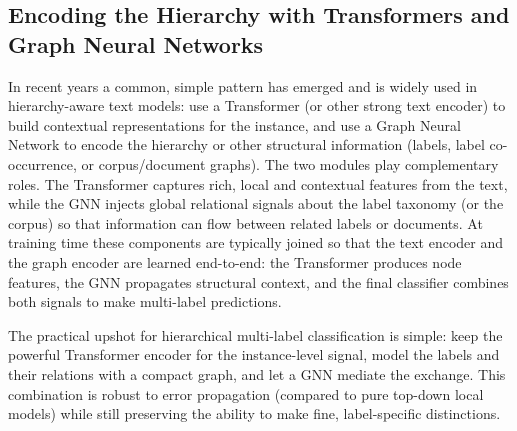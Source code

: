 \subsection{Encoding the Hierarchy with Transformers and Graph Neural Networks}

In recent years a common, simple pattern has emerged and is widely used in
hierarchy-aware text models: use a Transformer (or other strong text encoder)
to build contextual representations for the instance, and use a Graph Neural
Network to encode the hierarchy or other structural information (labels,
label co-occurrence, or corpus/document graphs). The two modules play
complementary roles. The Transformer captures rich, local and contextual
features from the text, while the GNN injects global relational signals about
the label taxonomy (or the corpus) so that information can flow between related
labels or documents. At training time these components are typically joined so
that the text encoder and the graph encoder are learned end-to-end: the
Transformer produces node features, the GNN propagates structural context, and
the final classifier combines both signals to make multi-label predictions.

The practical upshot for hierarchical multi-label classification is simple:
keep the powerful Transformer encoder for the instance-level signal, model the
labels and their relations with a compact graph, and let a GNN mediate the
exchange. This combination is robust to error propagation (compared to pure
top-down local models) while still preserving the ability to make fine,
label-specific distinctions.

